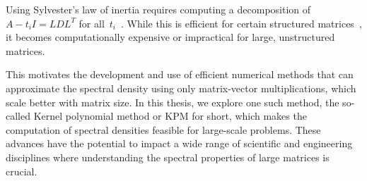 Using Sylvester's law of inertia requires computing a decomposition of~$A - t_i I = LDL^T$ for all~$t_i$~\cite{golub2013matrix}. While this is efficient for certain structured matrices~\cite{bennermach2012}, it becomes computationally expensive or impractical for large, unstructured matrices.

This motivates the development and use of efficient numerical methods that can approximate the spectral density using only matrix-vector multiplications, which scale better with matrix size. In this thesis, we explore one such method, the so-called Kernel polynomial method or KPM for short, which makes the computation of spectral densities feasible for large-scale problems. These advances have the potential to impact a wide range of scientific and engineering disciplines where understanding the spectral properties of large matrices is crucial.